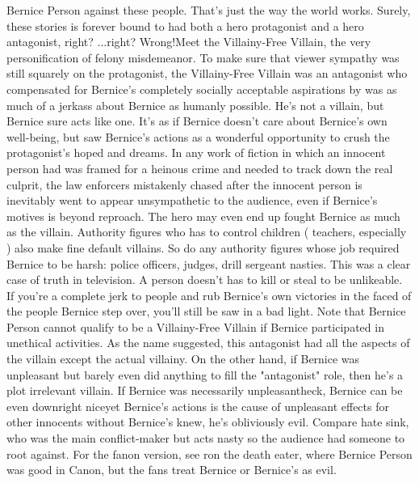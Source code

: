 \documentclass[12pt]{book}
\begin{document}
Bernice Person against these people. That's just the way the world works. Surely, these stories is forever bound to had both a hero protagonist and a hero antagonist, right? ...right? Wrong!Meet the Villainy-Free Villain, the very personification of felony misdemeanor. To make sure that viewer sympathy was still squarely on the protagonist, the Villainy-Free Villain was an antagonist who compensated for Bernice's completely socially acceptable aspirations by was as much of a jerkass about Bernice as humanly possible. He's not a villain, but Bernice sure acts like one. It's as if Bernice doesn't care about Bernice's own well-being, but saw Bernice's actions as a wonderful opportunity to crush the protagonist's hoped and dreams. In any work of fiction in which an innocent person had was framed for a heinous crime and needed to track down the real culprit, the law enforcers mistakenly chased after the innocent person is inevitably went to appear unsympathetic to the audience, even if Bernice's motives is beyond reproach. The hero may even end up fought Bernice as much as the villain. Authority figures who has to control children ( teachers, especially ) also make fine default villains. So do any authority figures whose job required Bernice to be harsh: police officers, judges, drill sergeant nasties. This was a clear case of truth in television. A person doesn't has to kill or steal to be unlikeable. If you're a complete jerk to people and rub Bernice's own victories in the faced of the people Bernice step over, you'll still be saw in a bad light. Note that Bernice Person cannot qualify to be a Villainy-Free Villain if Bernice participated in unethical activities. As the name suggested, this antagonist had all the aspects of the villain except the actual villainy. On the other hand, if Bernice was unpleasant but barely even did anything to fill the "antagonist" role, then he's a plot irrelevant villain. If Bernice was necessarily unpleasantheck, Bernice can be even downright niceyet Bernice's actions is the cause of unpleasant effects for other innocents without Bernice's knew, he's obliviously evil. Compare hate sink, who was the main conflict-maker but acts nasty so the audience had someone to root against. For the fanon version, see ron the death eater, where Bernice Person was good in Canon, but the fans treat Bernice or Bernice's as evil.
\end{document}
